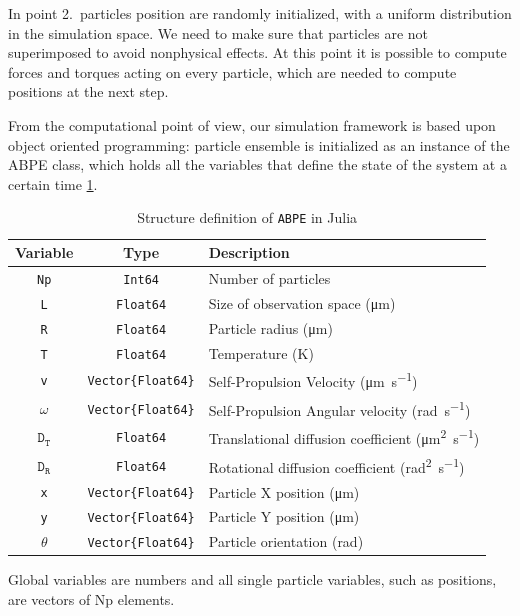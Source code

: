 \documentclass[../../master_thesis_np.tex]{subfiles}
\begin{document}
	In point 2.\ particles position are randomly initialized, with a uniform distribution in the simulation space. We need to make sure that particles are not superimposed to avoid nonphysical effects. At this point it is possible to compute forces and torques acting on every particle, which are needed to compute positions at the next step.  
	
	From the computational point of view, our simulation framework is based upon object oriented programming: particle ensemble is initialized as an instance of the ABPE class, which holds all the variables that define the state of the system at a certain time \ref{tab:ABPE2}. 
	\begin{table}[h]
		\centering
		\begin{tabular}{c|cl}
			\textbf{Variable} & \textbf{Type} & \textbf{Description} \\
			\hline
			\texttt{Np}  & \texttt{Int64} & Number of particles \\
			\texttt{L}   & \texttt{Float64} & Size of observation space (\unit{\micro\meter}) \\
			\texttt{R}   & \texttt{Float64} & Particle radius (\unit{\micro\meter}) \\
			\texttt{T}   & \texttt{Float64} & Temperature (\unit{\kelvin}) \\
			\texttt{v}   & \texttt{Vector\{Float64\}} & Self-Propulsion Velocity (\unit{\micro\meter\per\second}) \\
			\texttt{$\mathtt{\omega}$}   & \texttt{Vector\{Float64\}} & Self-Propulsion Angular velocity (\unit{\radian\per\second}) \\
			$\mathtt{D_T}$  & \texttt{Float64} & Translational diffusion coefficient (\unit{\square\micro\meter\per\second}) \\
			$\mathtt{D_R}$  & \texttt{Float64} & Rotational diffusion coefficient (\unit{\square\radian\per\second}) \\
			\texttt{x}   & \texttt{Vector\{Float64\}} & Particle X position (\unit{\micro\meter}) \\
			\texttt{y}   & \texttt{Vector\{Float64\}} & Particle Y position (\unit{\micro\meter}) \\
			\texttt{$\mathtt{\theta}$}   & \texttt{Vector\{Float64\}} & Particle orientation (\unit{\radian}) \\
		\end{tabular}
		\caption{Structure definition of \texttt{ABPE} in Julia}
		\label{tab:ABPE2}
	\end{table}
	Global variables are numbers and all single particle variables, such as positions, are vectors of Np elements. %
	
\end{document}
